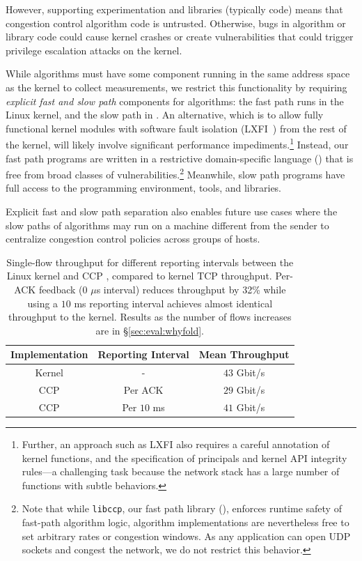 However, supporting experimentation and libraries (typically
\userspace code) means that congestion control algorithm code is untrusted.
Otherwise, bugs in algorithm or library code could cause kernel
crashes or create vulnerabilities that could trigger privilege escalation
attacks on the kernel.

 While algorithms must have
some component running in the same address space as the kernel to collect measurements,
we restrict this functionality by requiring {\em explicit fast and slow path} components for algorithms:
the fast path runs in the Linux kernel, and the slow path in \userspace.
%
An alternative, which is to allow fully functional kernel modules with software
fault isolation (\eg LXFI~\cite{lxfi}) from the rest of the kernel, will likely
involve significant performance impediments.\footnote{Further, an approach such as
LXFI also requires a careful annotation of kernel functions, and the
specification of principals and kernel API integrity rules---a challenging
task because the network stack has a large number of functions with subtle
behaviors.}
%
Instead, our fast path programs are written in a restrictive domain-specific language ()
that is free from broad classes of vulnerabilities.\footnote{Note that while \texttt{libccp}, our fast path library (), enforces runtime safety of fast-path algorithm logic,
algorithm implementations are nevertheless free to set arbitrary rates or congestion windows.
As any application can open UDP sockets and congest the network, we do not restrict this behavior.}
Meanwhile, slow path programs have full access to the \userspace programming environment,
tools, and libraries.

Explicit fast and slow path separation also enables future use cases where the
slow paths of algorithms may run on a machine different from the sender to
centralize congestion control policies across groups of hosts.

\begin{table}[]
    \centering
    \begin{tabular}{c|c|c}
        Implementation & Reporting Interval & Mean Throughput \\
        \hline
        Kernel & - & $43$ Gbit/s \\
        CCP & Per ACK & $29$ Gbit/s \\
        CCP & Per $10$ ms & $41$ Gbit/s \\
    \end{tabular}
    \caption{Single-flow throughput for different reporting intervals between
      the Linux kernel and CCP \userspace, compared to kernel TCP
      throughput. Per-ACK feedback (0 $\mu$s interval) reduces throughput by
      32\% while using a $10$ ms reporting interval
      achieves almost identical throughput to the kernel. Results as the number
      of flows  increases are in
      \S\ref{sec:eval:whyfold}.}\label{tab:perf:interval}
\end{table}

